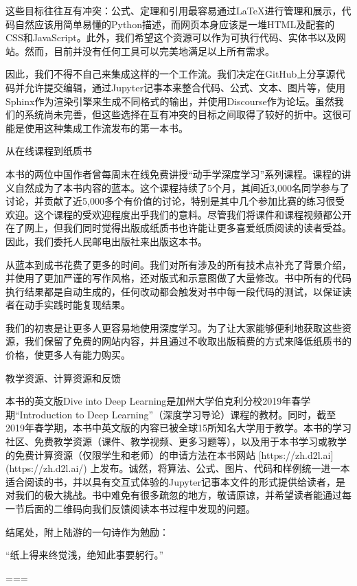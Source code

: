 这些目标往往互有冲突：公式、定理和引用最容易通过LaTeX进行管理和展示，代码自然应该用简单易懂的Python描述，而网页本身应该是一堆HTML及配套的CSS和JavaScript。此外，我们希望这个资源可以作为可执行代码、实体书以及网站。然而，目前并没有任何工具可以完美地满足以上所有需求。

因此，我们不得不自己来集成这样的一个工作流。我们决定在GitHub上分享源代码并允许提交编辑，通过Jupyter记事本来整合代码、公式、文本、图片等，使用Sphinx作为渲染引擎来生成不同格式的输出，并使用Discourse作为论坛。虽然我们的系统尚未完善，但这些选择在互有冲突的目标之间取得了较好的折中。这很可能是使用这种集成工作流发布的第一本书。

 从在线课程到纸质书

本书的两位中国作者曾每周末在线免费讲授“动手学深度学习”系列课程。课程的讲义自然成为了本书内容的蓝本。这个课程持续了5个月，其间近3,000名同学参与了讨论，并贡献了近5,000多个有价值的讨论，特别是其中几个参加比赛的练习很受欢迎。这个课程的受欢迎程度出乎我们的意料。尽管我们将课件和课程视频都公开在了网上，但我们同时觉得出版成纸质书也许能让更多喜爱纸质阅读的读者受益。因此，我们委托人民邮电出版社来出版这本书。

从蓝本到成书花费了更多的时间。我们对所有涉及的所有技术点补充了背景介绍，并使用了更加严谨的写作风格，还对版式和示意图做了大量修改。书中所有的代码执行结果都是自动生成的，任何改动都会触发对书中每一段代码的测试，以保证读者在动手实践时能复现结果。

我们的初衷是让更多人更容易地使用深度学习。为了让大家能够便利地获取这些资源，我们保留了免费的网站内容，并且通过不收取出版稿费的方式来降低纸质书的价格，使更多人有能力购买。

 

 教学资源、计算资源和反馈

本书的英文版Dive into Deep Learning是加州大学伯克利分校2019年春学期“Introduction to Deep Learning”（深度学习导论）课程的教材。同时，截至2019年春学期，本书中英文版的内容已被全球15所知名大学用于教学。本书的学习社区、免费教学资源（课件、教学视频、更多习题等），以及用于本书学习或教学的免费计算资源（仅限学生和老师）的申请方法在本书网站 [https://zh.d2l.ai](https://zh.d2l.ai/) 上发布。诚然，将算法、公式、图片、代码和样例统一进一本适合阅读的书，并以具有交互式体验的Jupyter记事本文件的形式提供给读者，是对我们的极大挑战。书中难免有很多疏忽的地方，敬请原谅，并希望读者能通过每一节后面的二维码向我们反馈阅读本书过程中发现的问题。

结尾处，附上陆游的一句诗作为勉励：

“纸上得来终觉浅，绝知此事要躬行。”

===

